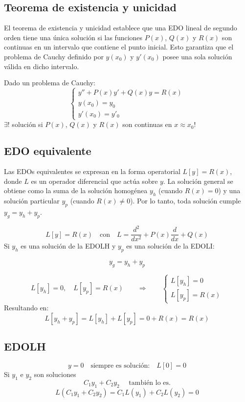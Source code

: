 \documentclass[a4paper,12pt]{article}
\begin{document}
\subsection{Teorema de existencia y unicidad}
\noindent
El teorema de existencia y unicidad establece que una EDO lineal de segundo orden tiene una única solución si las funciones \( P(x) \), \( Q(x) \) y \( R(x) \) son continuas en un intervalo que contiene el punto inicial.  
Esto garantiza que el problema de Cauchy definido por \( y(x_0) \) y \( y'(x_0) \) posee una sola solución válida en dicho intervalo.

\medskip
\noindent
Dado un problema de Cauchy:
\[
\begin{cases}
y'' + P(x)y' + Q(x)y = R(x) \\
y(x_0) = y_0 \\
y'(x_0) = y'_0
\end{cases}
\]
$\exists !$ solución si $P(x)$, $Q(x)$ y $R(x)$ son continuas en $x \approx x_0$! 

\subsection{EDO equivalente}

\noindent
Las EDOs equivalentes se expresan en la forma operatorial \( L[y] = R(x) \), donde \( L \) es un operador diferencial que actúa sobre \( y \).  
La solución general se obtiene como la suma de la solución homogénea \( y_h \) (cuando \( R(x) = 0 \)) y una solución particular \( y_p \) (cuando \( R(x) \neq 0 \)).  
Por lo tanto, toda solución cumple \( y_g = y_h + y_p \).

\[
L[y] = R(x) \quad \text{con} \quad L = \frac{d^2}{dx^2} + P(x)\frac{d}{dx} + Q(x)
\]
Si $y_h$ es una solución de la EDOLH y $y_p$ es una solución de la EDOLI:

\[
y_g = y_h + y_p
\]

\[
L[y_h] = 0, \quad L[y_p] = R(x) \qquad \Rightarrow \qquad 
\begin{cases}
L[y_h] = 0 \\[6pt]
L[y_p] = R(x)
\end{cases}
\]
Resultando en:
\[
L[y_h + y_p] = L[y_h] + L[y_p] =0 + R(x) = R(x)
\]

\subsection{EDOLH}
\vspace{-1 em}
\[
y = 0 \quad \text{siempre es solución:} \quad L[0] = 0
\]
Si \( y_1 \) e \( y_2 \) son soluciones 
\[
C_1 y_1 + C_2 y_2 \quad\text{ también lo es.}
\]
\[
L(C_1 y_1 + C_2 y_2) = C_1 L(y_1) + C_2 L(y_2) = 0
\]
\end{document}
